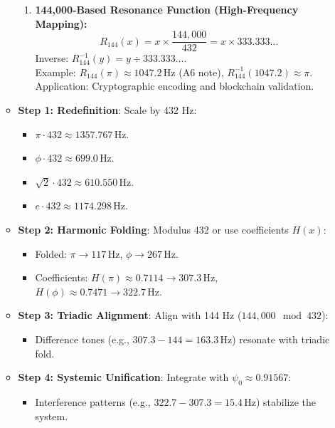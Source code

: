 \begin{itemize}
\begin{itemize}
\begin{enumerate}
            \item \textbf{144,000-Based Resonance Function (High-Frequency Mapping):} \\
            \[
            R_{144}(x) = x \times \frac{144,000}{432} = x \times 333.333\ldots
            \]
            Inverse: \( R_{144}^{-1}(y) = y \div 333.333\ldots \). \\
            Example: \( R_{144}(\pi) \approx 1047.2 \, \text{Hz} \) (A6 note), \( R_{144}^{-1}(1047.2) \approx \pi \). \\
            Application: Cryptographic encoding and blockchain validation.
        \end{enumerate}
        \item \textbf{Step 1: Redefinition}: Scale by 432 Hz:
        \begin{itemize}
            \item \(\pi \cdot 432 \approx 1357.767 \, \text{Hz}\).
            \item \(\phi \cdot 432 \approx 699.0 \, \text{Hz}\).
            \item \(\sqrt{2} \cdot 432 \approx 610.550 \, \text{Hz}\).
            \item \(e \cdot 432 \approx 1174.298 \, \text{Hz}\).
        \end{itemize}
        \item \textbf{Step 2: Harmonic Folding}: Modulus 432 or use coefficients \( H(x) \):
        \begin{itemize}
            \item Folded: \(\pi \rightarrow 117 \, \text{Hz}\), \(\phi \rightarrow 267 \, \text{Hz}\).
            \item Coefficients: \( H(\pi) \approx 0.7114 \rightarrow 307.3 \, \text{Hz} \), \( H(\phi) \approx 0.7471 \rightarrow 322.7 \, \text{Hz} \).
        \end{itemize}
        \item \textbf{Step 3: Triadic Alignment}: Align with 144 Hz (\( 144,000 \mod 432 \)):
        \begin{itemize}
            \item Difference tones (e.g., \( 307.3 - 144 = 163.3 \, \text{Hz} \)) resonate with triadic fold.
        \end{itemize}
        \item \textbf{Step 4: Systemic Unification}: Integrate with \(\psi_0 \approx 0.91567\):
        \begin{itemize}
            \item Interference patterns (e.g., \( 322.7 - 307.3 = 15.4 \, \text{Hz} \)) stabilize the system.

\end{itemize}
\end{itemize}
\end{itemize}
